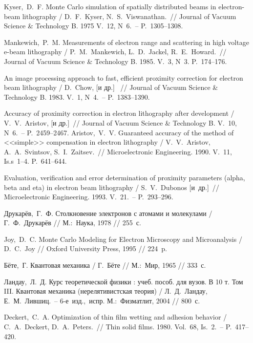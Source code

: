 \begin{thebibliography}{99}
 \tabfix Kyser,~D.~F. Monte Carlo simulation of spatially
distributed beams in electron-beam lithography / D.~F.~Kyser,
N.~S.~Viswanathan.~// Journal of Vacuum Science \& Technology B. 1975 V.~12,
N~6.~-- P.~1305--1308.

 \tabfix Mankewich,~P.~M. Measurements of electron range and scattering in
high voltage e-beam lithography / P.~M.~Mankewich, L.~D.~Jackel,
R.~E.~Howard.~// Journal of Vacuum Science \& Technology B. 1985. V.~3, N~3.
P.~174--176.

 \tabfix An image processing approach to fast, efficient proximity correction for
electron beam lithography / D.~Chow, [и др.] ~// Journal of Vacuum Science \& Technology B. 1983.
V.~1, N~4.~-- P.~1383--1390.%

 \tabfix Accuracy of proximity correction in electron lithography after
development / V.~V.~Aristov, [и др.]~// Journal of Vacuum Science \& Technology B. V.~10,
N~6.~-- P.~2459--2467.
 \tabfix Aristov,~V.~V. Guaranteed accuracy of the method of <<simple>>
compensation in electron lithography / V.~V.~Aristov, A.~A.~Svintsov,
S.~I.~Zaitsev.~// Microelectronic Engineering. 1990. V.~11, Is.s~1--4.
P.~641--644.

 \tabfix Evaluation, verification and error determination of proximity
parameters (alpha, beta and eta) in electron beam lithography / S.~V.~Dubonos [и~др.]~// Microelectronic
Engineering. 1993. V.~21.~-- P.~293--296.%

 \tabfix Друкарёв,~Г.~Ф. Столкновение электронов с атомами и молекулами /
Г.~Ф.~Друкарёв // М.:~Наука, 1978 // 255~с.

 \tabfix Joy,~D.~C. Monte Carlo Modeling for Electron Microscopy and
Microanalysis / D.~C.~Joy // Oxford University Press, 1995 // 224~p.

 \tabfix Бёте,~Г. Квантовая механика / Г.~Бёте // М.:~Мир, 1965 // 333~с.

 \tabfix Ландау,~Л.~Д. Курс теоретической физики : учеб. пособ. для вузов.
В 10 т. Том III. Квантовая механика (нерелятивистская теория) / Л.~Д.~Ландау, Е.~М.~Лившиц.~--
6-е~изд.,~испр. М.:~Физматлит, 2004 // 800~с.

 \tabfix Deckert,~C.~A. Optimization of thin film wetting and adhesion
behavior / C.~A.~Deckert, D.~A.~Peters.~// Thin solid films. 1980. Vol.~68,
Is.~2.~-- P.~417--420.


\end{thebibliography}
